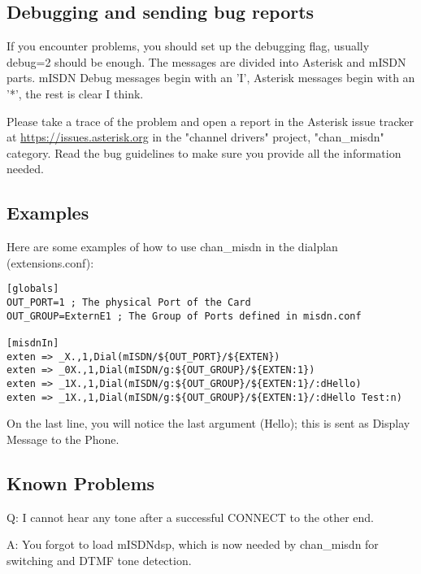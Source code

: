 \subsection{Debugging and sending bug reports}

If you encounter problems, you should set up the debugging flag, usually
debug=2 should be enough. The messages are divided into Asterisk and mISDN
parts.  mISDN Debug messages begin with an 'I', Asterisk messages begin with
an '*', the rest is clear I think.

Please take a trace of the problem and open a report in the Asterisk issue
tracker at \url{https://issues.asterisk.org} in the "channel drivers" project,
"chan\_misdn" category. Read the bug guidelines to make sure you
provide all the information needed.


\subsection{Examples}

Here are some examples of how to use chan\_misdn in the dialplan
(extensions.conf):

\begin{astlisting}
\begin{verbatim}
[globals]
OUT_PORT=1 ; The physical Port of the Card
OUT_GROUP=ExternE1 ; The Group of Ports defined in misdn.conf

[misdnIn]
exten => _X.,1,Dial(mISDN/${OUT_PORT}/${EXTEN})
exten => _0X.,1,Dial(mISDN/g:${OUT_GROUP}/${EXTEN:1})
exten => _1X.,1,Dial(mISDN/g:${OUT_GROUP}/${EXTEN:1}/:dHello)
exten => _1X.,1,Dial(mISDN/g:${OUT_GROUP}/${EXTEN:1}/:dHello Test:n)
\end{verbatim}
\end{astlisting}

On the last line, you will notice the last argument (Hello); this is sent
as Display Message to the Phone.

\subsection{Known Problems}

Q: I cannot hear any tone after a successful CONNECT to the other end.

A: You forgot to load mISDNdsp, which is now needed by chan\_misdn for switching
and DTMF tone detection.
